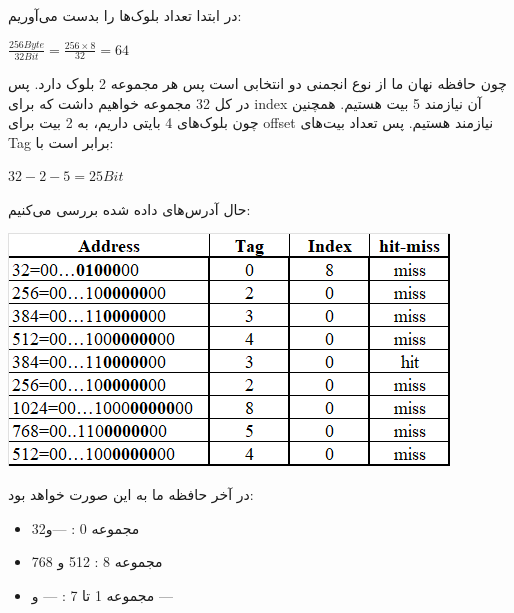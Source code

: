 در ابتدا تعداد بلوک‌ها را بدست می‌آوریم:

\setLTR
$
\frac{256Byte}{32Bit} = \frac{256 \times 8}{32} = 64
$
\setRTL

چون حافظه نهان ما از نوع انجمنی دو انتخابی است پس هر مجموعه 2 بلوک دارد. پس در کل 32 مجموعه خواهیم داشت که برای index آن نیازمند 5 بیت هستیم. همچنین چون بلوک‌های 4 بایتی داریم، به 2 بیت برای offset نیازمند هستیم. پس تعداد بیت‌های Tag برابر است با:

\setLTR
$
32 - 2 - 5 = 25Bit
$
\setRTL

حال آدرس‌های داده شده بررسی می‌کنیم:

\setLTR
\qquad\qquad\qquad\qquad\qquad\includegraphics[width=0.5\linewidth]{figs/1.png}
\setRTL

در آخر حافظه ما به این صورت خواهد بود:

\begin{itemize}
	\item
	 مجموعه 0 : ---و32
	 \item 
	 مجموعه 8 : 512 و 768
	 \item 
	 مجموعه 1 تا 7 : --- و ---
\end{itemize}